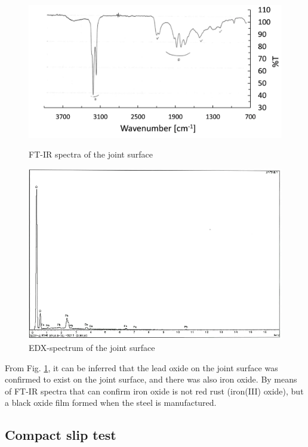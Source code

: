 \begin{figure}[htbp]
    \centering
    \begin{minipage}[t]{0.7\textwidth}
    \includegraphics[width=\linewidth]{imgs/ch3/fig4.png}
    \caption{FT-IR spectra of the joint surface}
    \label{ch3fig4}  
    \end{minipage}
    \begin{minipage}[t]{0.7\textwidth}
    \includegraphics[width=\linewidth]{imgs/ch3/fig5.png}
    \caption{EDX-spectrum of the joint surface}
    \label{ch3fig5}  
    \end{minipage}
\end{figure}

From Fig. \ref{ch3fig5}, it can be inferred that the lead oxide on the joint surface was confirmed to exist on the joint surface, and there was also iron oxide. By means of FT-IR spectra that can confirm iron oxide is not red rust (iron(III) oxide), but a black oxide film formed when the steel is manufactured.


\subsection{Compact slip test}

